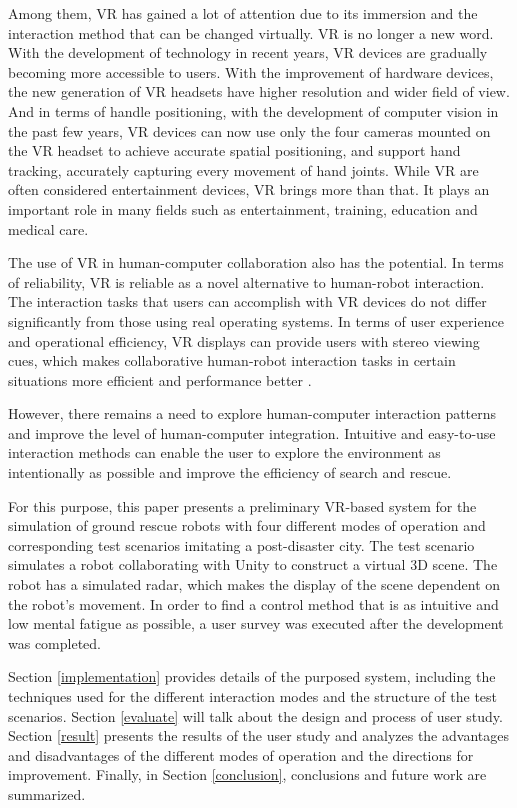 Among them, VR has gained a lot of attention due to its immersion and the interaction method that can be changed virtually. VR is no longer a new word. With the development of technology in recent years, VR devices are gradually becoming more accessible to users. With the improvement of hardware devices, the new generation of VR headsets have higher resolution and wider field of view. And in terms of handle positioning, with the development of computer vision in the past few years, VR devices can now use only the four cameras mounted on the VR headset to achieve accurate spatial positioning, and support hand tracking, accurately capturing every movement of hand joints. While VR are often considered entertainment devices, VR brings more than that. It plays an important role in many fields such as entertainment, training, education and medical care.

The use of VR in human-computer collaboration also has the potential. In terms of reliability, VR is reliable as a novel alternative to human-robot interaction. The interaction tasks that users can accomplish with VR devices do not differ significantly from those using real operating systems\cite{Villani:2018ub}. In terms of user experience and operational efficiency, VR displays can provide users with stereo viewing cues, which makes collaborative human-robot interaction tasks in certain situations more efficient and performance better \cite{Liu:2017tw}.

However, there remains a need to explore human-computer interaction patterns and improve the level of human-computer integration\cite{Wang:2017uy}. Intuitive and easy-to-use interaction methods can enable the user to explore the environment as intentionally as possible and improve the efficiency of search and rescue.

For this purpose, this paper presents a preliminary VR-based system for the simulation of ground rescue robots with four different modes of operation and corresponding test scenarios imitating a post-disaster city. The test scenario simulates a robot collaborating with Unity to construct a virtual 3D scene. The robot has a simulated radar, which makes the display of the scene dependent on the robot's movement.
In order to find a control method that is as intuitive and low mental fatigue as possible, a user survey was executed after the development was completed.



Section \ref{implementation} provides details of the purposed system, including the techniques used for the different interaction modes and the structure of the test scenarios.
Section \ref{evaluate} will talk about the design and process of user study.
Section \ref{result} presents the results of the user study and analyzes the advantages and disadvantages of the different modes of operation and the directions for improvement.
Finally, in Section \ref{conclusion}, conclusions and future work are summarized.


